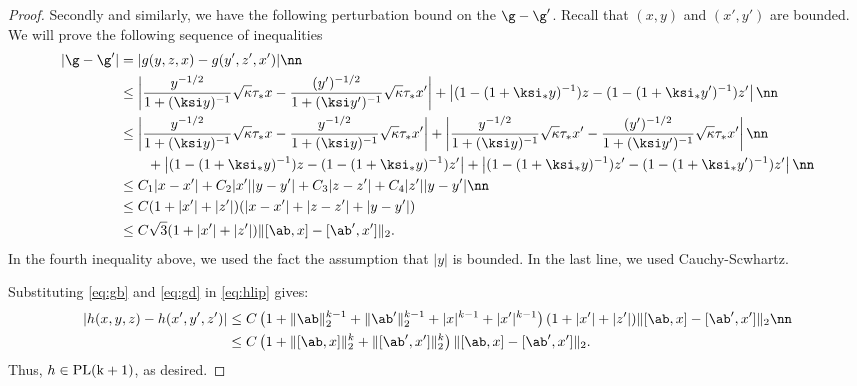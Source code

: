 \begin{proof}
Secondly and similarly, we have the following perturbation bound on the $\g-\g'$. Recall that $(x,y)$ and $(x',y')$ are bounded. We will prove the following sequence of inequalities
\begin{align}
|{\g-\g'}|&= |g(y,z,x)-g(y',z',x')| \nn\\
&\leq \left|\frac{y^{-1/2}}{1+(\ksi y)^{-1}}\sqrt{\kappa}\tau_* x - \frac{(y')^{-1/2}}{1+(\ksi y')^{-1}}\sqrt{\kappa}\tau_* x'\right|
 + \left|(1-(1+\ksi_*y)^{-1})z-(1-(1+\ksi_*y')^{-1})z'\right|\nn\\
 &\leq
\left|\frac{y^{-1/2}}{1+(\ksi y)^{-1}}\sqrt{\kappa}\tau_* x - \frac{y^{-1/2}}{1+(\ksi y)^{-1}}\sqrt{\kappa}\tau_* x'\right| +\left|\frac{y^{-1/2}}{1+(\ksi y)^{-1}}\sqrt{\kappa}\tau_* x'- \frac{(y')^{-1/2}}{1+(\ksi y')^{-1}}\sqrt{\kappa}\tau_* x'\right|\nn\\
 &\qquad+ \left|(1-(1+\ksi_*y)^{-1})z-(1-(1+\ksi_*y)^{-1})z'\right| + \left|(1-(1+\ksi_*y)^{-1})z'-(1-(1+\ksi_*y')^{-1})z'\right| \nn\\
&\leq C_1|x-x'| + C_2|x'||y-y'| + C_3|z-z'| + C_4|z'||y-y'|\nn\\
&\leq C(1+|x'| + |z'|)(|x-x'| + |z-z'| + |y-y'|)\\
&\leq C\sqrt{3}(1+|x'| + |z'|)\|[\ab,x]-[\ab',x']\|_2
.\label{eq:gd}
\end{align}
In the fourth inequality above, we used the fact the assumption that $|y|$ is bounded. In the last line, we used Cauchy-Scwhartz.

Substituting \eqref{eq:gb} and \eqref{eq:gd} in \eqref{eq:hlip} gives:
\begin{align}
|h(x,y,z) - h(x',y',z')|  &\leq C\left(1+\|\ab\|_2^{k-1}+\|\ab'\|_2^{k-1}+|x|^{k-1}+|x'|^{k-1}\right)(1+|x'| + |z'|)\|[\ab,x]-[\ab',x']\|_2\nn \\
&\leq C\left(1+\|[\ab,x]\|_2^{k}+\|[\ab',x']\|_2^{k}\right)\|[\ab,x]-[\ab',x']\|_2.
\end{align}
Thus, $h\in\rm{PL}(k+1)$, as desired.
\end{proof}























